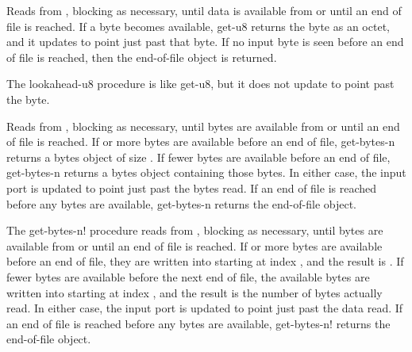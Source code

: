 \begin{entry}{%
}
   
Reads from , blocking as necessary, until data is
available from  or until an end of file is reached. If a
byte becomes available, {\cf get-u8} returns the byte as an octet, and it
updates  to point just past that byte. If no input
byte is seen before an end of file is reached, then the end-of-file
object is returned.
\end{entry}

\begin{entry}{%
}
   
The {\cf lookahead-u8} procedure is like {\cf get-u8}, but it does not 
update  to point past the byte.
\end{entry}

\begin{entry}{%
}
   
Reads from , blocking as necessary, until 
bytes are available from  or until an end of file is
reached. If  or more bytes are available before an end
of file, {\cf get-bytes-n} returns a bytes object of size . If fewer
bytes are available before an end of file, {\cf get-bytes-n} returns a bytes object
containing those bytes. In either case, the input port is updated to
point just past the bytes read.  If an end of file is reached before
any bytes are available, {\cf get-bytes-n} returns the end-of-file object.
\end{entry}

\begin{entry}{%
}
   
   
The {\cf get-bytes-n!} procedure reads from , blocking as necessary, until
 bytes are available from  or until an end of file is
reached. If  or more bytes are available before an end of file,
they are written into  starting at index , and
the result is . If fewer bytes are available before
the next end of file, the available bytes are written into 
starting at index , and the result is the number of bytes actually
read. In either case, the input port is updated to point just past the
data read. If an end of file is reached before any bytes
are available, {\cf get-bytes-n!} returns the end-of-file object.
\end{entry}

